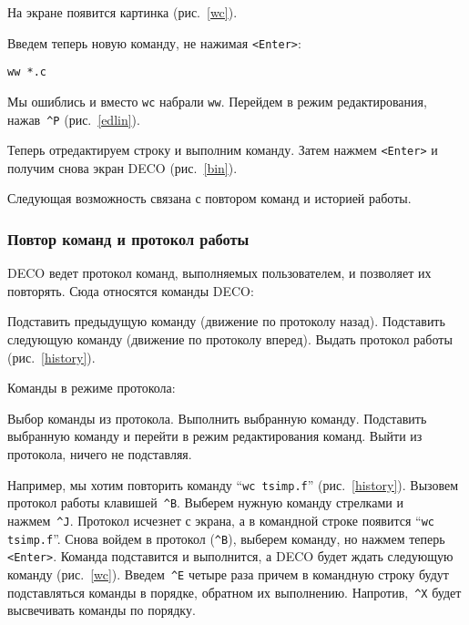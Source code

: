 На экране появится картинка (рис.~\ref{wc}).


Введем теперь новую команду, не нажимая {\tt <Enter>}:
\begin{source}
\begin{verbatim}
ww *.c
\end{verbatim}
\end{source}
Мы ошиблись и вместо {\tt wc} набрали {\tt ww}. Перейдем в режим редактирования,
нажав~{\tt \^{}P} (рис.~\ref{edlin}).


Теперь отредактируем строку и выполним команду.
Затем нажмем {\tt <Enter>} и получим снова экран DECO (рис.~\ref{bin}).

Следующая возможность связана с повтором команд и историей работы.

\subsubsection{Повтор команд и протокол работы}

DECO ведет протокол команд, выполняемых пользователем,
и позволяет их повторять. Сюда относятся команды DECO:

\begin{example}
Подставить предыдущую команду (движение по протоколу назад).
Подставить следующую команду (движение по протоколу вперед).
Выдать протокол работы (рис.~\ref{history}).
\end{example}


Команды в режиме протокола:

\begin{example}
\litem{$\uparrow$, $\downarrow$}
Выбор команды из протокола.
Выполнить выбранную команду.
Подставить выбранную команду и перейти в режим редактирования команд.
Выйти из протокола, ничего не подставляя.
\end{example}

Например, мы хотим повторить команду ``{\tt wc tsimp.f}'' (рис.~\ref{history}).
Вызовем протокол работы клавишей~{\tt \^{}B}.
Выберем нужную команду стрелками и нажмем~{\tt \^{}J}.
Протокол исчезнет с экрана,
а в командной строке появится ``{\tt wc tsimp.f}''.
Снова войдем в протокол ({\tt \^{}B}), выберем команду, но
нажмем теперь {\tt <Enter>}.
Команда подставится и выполнится, а DECO будет ждать
следующую команду (рис.~\ref{wc}).
Введем~{\tt \^{}E} четыре раза причем в командную
строку будут подставляться команды в порядке, обратном их
выполнению. Напротив,~{\tt \^{}X} будет высвечивать команды по порядку.

